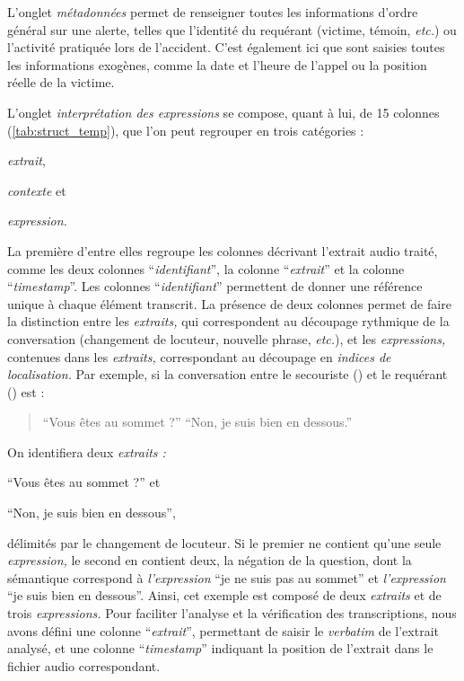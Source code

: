 L'onglet \emph{métadonnées} permet de renseigner toutes les
informations d'ordre général sur une alerte, telles que l'identité du
requérant (victime, témoin, \emph{etc.}) ou l’activité pratiquée lors
de l'accident. C'est également ici que sont saisies toutes les
informations exogènes, comme la date et l'heure de l'appel ou la
position réelle de la victime.

L'onglet \emph{interprétation
  des expressions} se compose, quant à lui, de 15 colonnes
(\autoref{tab:struct_temp}), que l'on peut regrouper en trois
catégories :
%
\begin{enumerate*}[label=(\alph*)]
\item \emph{extrait},
\item \emph{contexte} et
\item \emph{expression.}
\end{enumerate*}

La première d'entre elles regroupe les colonnes décrivant l'extrait
audio traité, comme les deux colonnes \enquote{\emph{identifiant}}, la
colonne \enquote{\emph{extrait}} et la colonne
\enquote{\emph{timestamp}}. Les colonnes \enquote{\emph{identifiant}}
permettent de donner une référence unique à chaque élément
transcrit. La présence de deux colonnes permet de faire la distinction
entre les \emph{extraits,} qui correspondent au découpage rythmique de
la conversation (changement de locuteur, nouvelle phrase,
\emph{etc.}), et les \emph{expressions,} contenues dans les
\emph{extraits,} correspondant au découpage en \emph{indices de
  localisation.} Par exemple, si la conversation entre le secouriste
() et le requérant () est :

\begin{quote}
  \begin{dialogue}
    \Sec \enquote{Vous êtes au sommet ?}
    \Req \enquote{Non, je suis bien en dessous.}
  \end{dialogue}
\end{quote}

On identifiera deux \emph{extraits :}
%
\begin{enumerate*}[label=(\alph*)]
\item \enquote{Vous êtes au sommet ?} et
\item \enquote{Non, je suis bien en dessous},
\end{enumerate*}
%
délimités par le changement de locuteur. Si le premier ne contient
qu'une seule \emph{expression,} le second en contient deux, la
négation de la question, dont la sémantique correspond à
\emph{l'expression} \enquote{je ne suis pas au sommet} et
\emph{l'expression} \enquote{je suis bien en dessous}. Ainsi, cet
exemple est composé de deux \emph{extraits} et de trois
\emph{expressions.} Pour faciliter l'analyse et la vérification des
transcriptions, nous avons défini une colonne
\enquote{\emph{extrait}}, permettant de saisir le \emph{verbatim} de
l'extrait analysé, et une colonne \enquote{\emph{timestamp}} indiquant
la position de l'extrait dans le fichier audio correspondant.

